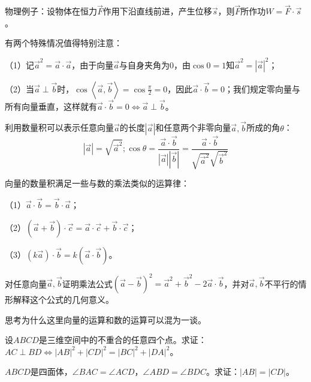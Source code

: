 物理例子：设物体在恒力\(\vec{F}\)作用下沿直线前进，产生位移\(\vec{s}\)，则\(\vec{F}\)所作功\(W = \vec{F} \cdot \vec{s}\)。

有两个特殊情况值得特别注意：

（1）记\(\vec{a}^{2} = \vec{a} \cdot \vec{a}\)，由于向量\(\vec{a}\)与自身夹角为0，由\(\cos 0 = 1\)知\(\vec{a}^{2} = \left| \vec{a} \right|^{2}\)；

（2）当\(\vec{a} \perp \vec{b}\)时，\(\cos \left\langle \vec{a} , \vec{b} \right\rangle = \cos \frac{\pi}{2} = 0\)，因此\(\vec{a} \cdot \vec{b} = 0\)；我们规定零向量与所有向量垂直，这样就有\(\vec{a} \cdot \vec{b} = 0 \Longleftrightarrow \vec{a} \perp \vec{b}\)。

利用数量积可以表示任意向量\(\vec{a}\)的长度\(\left| \vec{a} \right|\)和任意两个非零向量\(\vec{a} , \vec{b}\)所成的角\(\theta\)：
\begin{equation}
    \left| \vec{a} \right| = \sqrt{\vec{a}^{2}} ; \cos \theta = \frac{\vec{a} \cdot \vec{b}}{\left| \vec{a} \right| \left| \vec{b} \right|} = \frac{\vec{a} \cdot \vec{b}}{\sqrt{\vec{a}^{2}} \sqrt{\vec{b}^{2}}}
\end{equation}

向量的数量积满足一些与数的乘法类似的运算律：

（1）\(\vec{a} \cdot \vec{b} = \vec{b} \cdot \vec{a}\)；

（2）\(\left( \vec{a} + \vec{b} \right) \cdot \vec{c} = \vec{a} \cdot \vec{c} + \vec{b} \cdot \vec{c}\)；

（3）\(\left( k \vec{a} \right) \cdot \vec{b} = k \left( \vec{a} \cdot \vec{b} \right)\)。
\newpage
\begin{example}
对任意向量\(\vec{a} , \vec{b}\)证明乘法公式\({\left( \vec{a} - \vec{b} \right)}^{2} = \vec{a}^{2} + \vec{b}^{2} - 2 \vec{a} \cdot \vec{b}\)，并对\(\vec{a} , \vec{b}\)不平行的情形解释这个公式的几何意义。
\end{example}

{\kaiti{}思考\quad 为什么这里向量的运算和数的运算可以混为一谈。}

\begin{example}
设\(A B C D\)是三维空间中的不重合的任意四个点。求证：\(A C \perp B D \Longleftrightarrow \left| A B \right|^{2} + \left| C D \right|^{2} = \left| B C \right|^{2} + \left| D A \right|^{2}\)。

\end{example}

\begin{example}
\(A B C D\)是四面体，\(\angle B A C = \angle A C D\)，\(\angle A B D = \angle B D C\)。求证：\(\left| A B \right| = \left| C D \right|\)。
\end{example}

